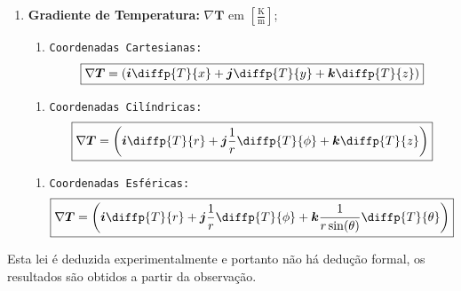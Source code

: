 \documentclass{article}
\begin{document}
\begin{enumerate}[rightmargin = \leftmargin]
                    \item \textbf{Gradiente de Temperatura:} $\nabla \boldsymbol{T}$ em $\left[\frac{\text{K}}{\text{m}}\right]$;
                        \begin{enumerate}[noitemsep]
                            \item \texttt{Coordenadas Cartesianas:}
                                \begin{equation}
                                    \boxed{
                                        \nabla \boldsymbol{T} = 
                                        \left(
                                            \boldsymbol{i}\diffp{T}{x} + 
                                            \boldsymbol{j}\diffp{T}{y} + 
                                            \boldsymbol{k}\diffp{T}{z}
                                        \right)
                                    }
                                \end{equation}
                        \end{enumerate}

                        \begin{enumerate}[noitemsep]
                            \item \texttt{Coordenadas Cilíndricas:}
                                \begin{equation}
                                    \boxed{
                                        \nabla \boldsymbol{T} = 
                                        \left(
                                            \boldsymbol{i}\diffp{T}{r} + 
                                            \boldsymbol{j}\frac{1}{r}\diffp{T}{\phi} + 
                                            \boldsymbol{k}\diffp{T}{z}
                                        \right)
                                    }
                                \end{equation}
                        \end{enumerate}

                        \begin{enumerate}[noitemsep]
                            \item \texttt{Coordenadas Esféricas:}
                                \begin{equation}
                                    \boxed{
                                        \nabla \boldsymbol{T} = 
                                        \left(
                                            \boldsymbol{i}\diffp{T}{r} + 
                                            \boldsymbol{j}\frac{1}{r}\diffp{T}{\phi} + 
                                            \boldsymbol{k}\frac{1}{r\sin(\theta)}\diffp{T}{\theta}
                                        \right)
                                    }
                                \end{equation}
                        \end{enumerate}
                \end{enumerate}
            Esta lei é deduzida experimentalmente e portanto não há dedução formal, os resultados são obtidos a partir da observação.
\end{document}
